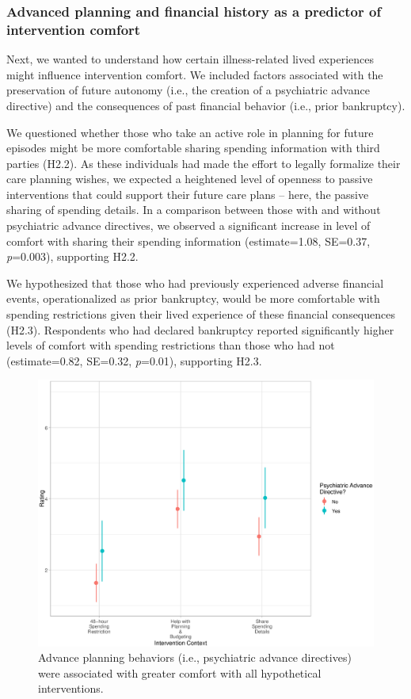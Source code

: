 \documentclass[10pt]{article}
\begin{document}
\subsubsection{Advanced planning and financial history as a predictor of intervention comfort}

Next, we wanted to understand how certain illness-related lived experiences might influence intervention comfort. We included factors associated with the preservation of future autonomy (i.e., the creation of a psychiatric advance directive) and the consequences of past financial behavior (i.e., prior bankruptcy).

We questioned whether those who take an active role in planning for future episodes might be more comfortable sharing spending information with third parties (H2.2). As these individuals had made the effort to legally formalize their care planning wishes, we expected a heightened level of openness to passive interventions that could support their future care plans -- here, the passive sharing of spending details. In a comparison between those with and without psychiatric advance directives, we observed a significant increase in level of comfort with sharing their spending information (estimate=1.08, SE=0.37, \emph{p}=0.003), supporting H2.2.

We hypothesized that those who had previously experienced adverse financial events, operationalized as prior bankruptcy, would be more comfortable with spending restrictions given their lived experience of these financial consequences (H2.3). Respondents who had declared bankruptcy reported significantly higher levels of comfort with spending restrictions than those who had not (estimate=0.82, SE=0.32, \emph{p}=0.01), supporting H2.3.

\begin{figure}[!ht]
  \centering
  \includegraphics[scale=0.5]{figures/H2.2_interaction_context_PAD.eps}
  \caption{Advance planning behaviors (i.e., psychiatric advance directives) were associated with greater comfort with all hypothetical interventions.}
  \label{fig:H2.2_interaction_context_PAD}
\end{figure}
\end{document}
